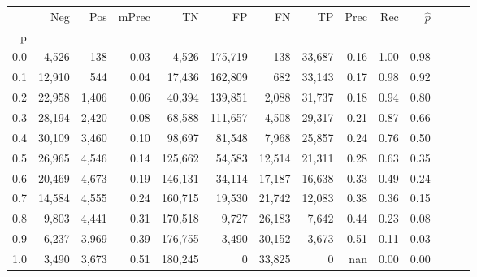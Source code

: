 \begin{tabular}{rrrrrrrrrrrrrr}
\toprule
{} &     Neg &    Pos & mPrec &       TN &       FP &      FN &      TP &  Prec &   Rec & $\hat{p}$ \\
p   &         &        &       &          &          &         &         &       &       &           \\
\midrule
0.0 &   4,526 &    138 &  0.03 &    4,526 &  175,719 &     138 &  33,687 &  0.16 &  1.00 &      0.98 \\
0.1 &  12,910 &    544 &  0.04 &   17,436 &  162,809 &     682 &  33,143 &  0.17 &  0.98 &      0.92 \\
0.2 &  22,958 &  1,406 &  0.06 &   40,394 &  139,851 &   2,088 &  31,737 &  0.18 &  0.94 &      0.80 \\
0.3 &  28,194 &  2,420 &  0.08 &   68,588 &  111,657 &   4,508 &  29,317 &  0.21 &  0.87 &      0.66 \\
0.4 &  30,109 &  3,460 &  0.10 &   98,697 &   81,548 &   7,968 &  25,857 &  0.24 &  0.76 &      0.50 \\
0.5 &  26,965 &  4,546 &  0.14 &  125,662 &   54,583 &  12,514 &  21,311 &  0.28 &  0.63 &      0.35 \\
0.6 &  20,469 &  4,673 &  0.19 &  146,131 &   34,114 &  17,187 &  16,638 &  0.33 &  0.49 &      0.24 \\
0.7 &  14,584 &  4,555 &  0.24 &  160,715 &   19,530 &  21,742 &  12,083 &  0.38 &  0.36 &      0.15 \\
0.8 &   9,803 &  4,441 &  0.31 &  170,518 &    9,727 &  26,183 &   7,642 &  0.44 &  0.23 &      0.08 \\
0.9 &   6,237 &  3,969 &  0.39 &  176,755 &    3,490 &  30,152 &   3,673 &  0.51 &  0.11 &      0.03 \\
1.0 &   3,490 &  3,673 &  0.51 &  180,245 &        0 &  33,825 &       0 &   nan &  0.00 &      0.00 \\
\bottomrule
\end{tabular}
